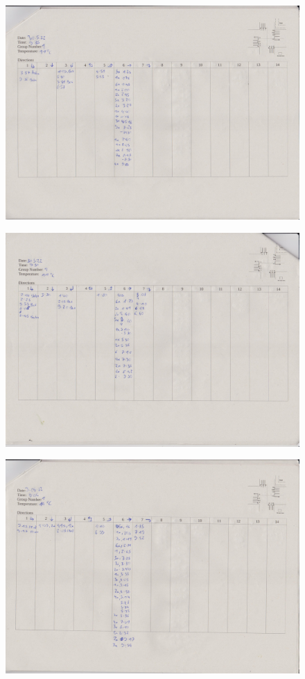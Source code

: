 \begin{figure}[htbp]
  \includegraphics[width=\linewidth]{scans/Bild (7).jpg}
\end{figure}

\begin{figure}[htbp]
  \includegraphics[width=\linewidth]{scans/Bild (8).jpg}
\end{figure}

\begin{figure}[htbp]
  \includegraphics[width=\linewidth]{scans/Bild (9).jpg}
\end{figure}

